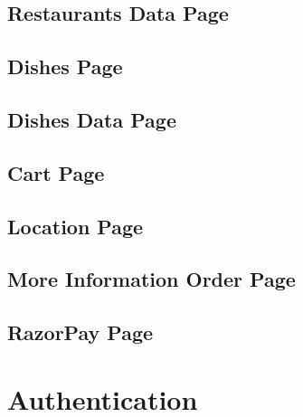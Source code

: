 \subsection{Restaurants Data Page}

\subsection{Dishes Page}

\subsection{Dishes Data Page}


\subsection{Cart Page}


\subsection{Location Page}


\subsection{More Information Order Page}

\subsection{RazorPay Page}

\section{Authentication}
